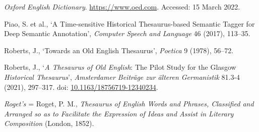 \begin{list}{}
\item %
\textit{Oxford English Dictionary}. \url{https://www.oed.com}. Accessed: 15 March 2022.

\item %
Piao, S. et al., `A Time-sensitive Historical Thesaurus-based Semantic Tagger for Deep Semantic Annotation', \textit{Computer Speech and Language} 46 (2017), 113–35.






\item %
Roberts, J., `Towards an Old English Thesaurus', \textit{Poetica} 9 (1978), 56–72.

\item %
Roberts, J., `\textit{A Thesaurus of Old English}: The Pilot Study for the Glasgow \textit{Historical Thesaurus}', \textit{Amsterdamer Beiträge zur älteren Germanistik} 81.3-4 (2021), 297–317. doi: \href{https://doi.org/10.1163/18756719-12340234}{\url{10.1163/18756719-12340234}}.

\item %
\textit{Roget's} = Roget, P. M., \textit{Thesaurus of English Words and Phrases, Classified and Arranged so as to Facilitate the Expression of Ideas and Assist in Literary Composition} (London, 1852).


\end{list}
